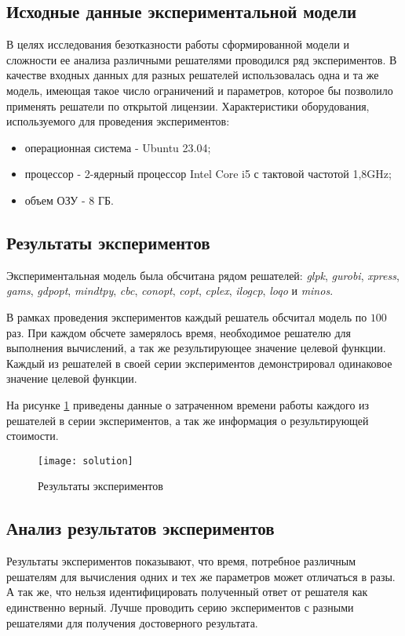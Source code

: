 \subsection*{Исходные данные экспериментальной модели}
В целях исследования безотказности работы сформированной модели и сложности ее анализа различными решателями проводился ряд экспериментов. В качестве входных данных для разных решателей использовалась одна и та же модель, имеющая такое число ограничений и параметров, которое бы позволило применять решатели по открытой лицензии.
Характеристики оборудования, используемого для проведения экспериментов:
\begin{itemize}
  \item операционная система - Ubuntu 23.04;
  \item процессор - 2-ядерный процессор Intel Core i5 с тактовой частотой 1,8GHz;
  \item объем ОЗУ - 8 ГБ.
\end{itemize}

\subsection*{Результаты экспериментов}
Экспериментальная модель была обсчитана рядом решателей: \textit{glpk}, \textit{gurobi}, \textit{xpress}, \textit{gams}, \textit{gdpopt}, \textit{mindtpy}, \textit{cbc}, \textit{conopt}, \textit{copt}, \textit{cplex}, \textit{ilogcp}, \textit{loqo} и \textit{minos}.

В рамках проведения экспериментов каждый решатель обсчитал модель по $100$ раз. При каждом обсчете замерялось время, необходимое решателю для выполнения вычислений, а так же результирующее значение целевой функции. Каждый из решателей в своей серии экспериментов демонстрировал одинаковое значение целевой функции.

На рисунке \ref{fig:solution} приведены данные о затраченном времени работы каждого из решателей в серии экспериментов, а так же информация о результирующей стоимости.

\begin{figure}[H]
  \centering
  \texttt{[image: solution]}
  \caption{Результаты экспериментов}
  \label{fig:solution}
\end{figure}

\subsection*{Анализ результатов экспериментов}
Результаты экспериментов показывают, что время, потребное различным решателям для вычисления одних и тех же параметров может отличаться в разы. А так же, что нельзя идентифицировать полученный ответ от решателя как единственно верный. Лучше проводить серию экспериментов с разными решателями для получения достоверного результата.

